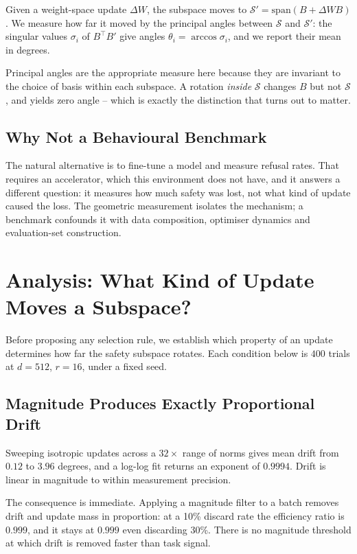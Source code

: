 \documentclass[10pt,twocolumn,letterpaper]{article}
\begin{document}
Given a weight-space update $\Delta W$, the subspace moves to $\mathcal{S}' = \mathrm{span}(B + \Delta W B)$. We measure how far it moved by the principal angles between $\mathcal{S}$ and $\mathcal{S}'$: the singular values $\sigma_i$ of $B^{\top} B'$ give angles $\theta_i = \arccos \sigma_i$, and we report their mean in degrees.

Principal angles are the appropriate measure here because they are invariant to the choice of basis within each subspace. A rotation \textit{inside} $\mathcal{S}$ changes $B$ but not $\mathcal{S}$, and yields zero angle -- which is exactly the distinction that turns out to matter.


\subsection{Why Not a Behavioural Benchmark}


The natural alternative is to fine-tune a model and measure refusal rates. That requires an accelerator, which this environment does not have, and it answers a different question: it measures how much safety was lost, not what kind of update caused the loss. The geometric measurement isolates the mechanism; a benchmark confounds it with data composition, optimiser dynamics and evaluation-set construction.




\section{Analysis: What Kind of Update Moves a Subspace?}


Before proposing any selection rule, we establish which property of an update determines how far the safety subspace rotates. Each condition below is $400$ trials at $d = 512$, $r = 16$, under a fixed seed.


\subsection{Magnitude Produces Exactly Proportional Drift}


Sweeping isotropic updates across a $32\times$ range of norms gives mean drift from $0.12$ to $3.96$ degrees, and a log-log fit returns an exponent of $0.9994$. Drift is linear in magnitude to within measurement precision.

The consequence is immediate. Applying a magnitude filter to a batch removes drift and update mass in proportion: at a 10\% discard rate the efficiency ratio is $0.999$, and it stays at $0.999$ even discarding 30\%. There is no magnitude threshold at which drift is removed faster than task signal.
\end{document}
